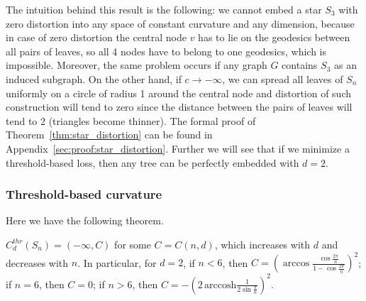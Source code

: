\documentclass[runningheads]{llncs}
\begin{document}
The intuition behind this result is the following: we cannot embed a star $S_3$ with zero distortion into any space of constant curvature and any dimension, because in case of zero distortion the central node $v$ has to lie on the geodesics between all pairs of leaves, so all 4 nodes have to belong to one geodesics, which is impossible. Moreover, the same problem occurs if any graph $G$ contains $S_3$ as an induced subgraph.
On the other hand, if $c \to -\infty$, we can spread all leaves of $S_n$ uniformly on a circle of radius 1 around the central node and distortion of such construction will tend to zero since the distance between the pairs of leaves will tend to 2 (triangles become thinner). 
The formal proof of Theorem~\ref{thm:star_distortion} can be found in Appendix~\ref{sec:proof:star_distortion}.
Further we will see that if we minimize a threshold-based loss, then any tree can be perfectly embedded with $d = 2$.





\subsubsection{Threshold-based curvature} 
Here we have the following theorem.

\begin{theorem}\label{thm:star_threshold}
$C_d^{thr}(S_n) = (-\infty, C)$ for some $C = C(n,d)$, which increases with $d$ and decreases with $n$. In particular, for $d = 2$, if $n < 6$, then $C = \left(\arccos \frac{\cos \frac{2\pi}{n}}{1 - \cos \frac{2\pi}{n}}\right)^2$; if $n = 6$, then $C = 0$; if $n > 6$, then $C = - \left(2\,\mathrm{arccosh}\frac{1}{2\sin \frac{\pi}{n}}\right)^2$.
\end{theorem}
\end{document}
